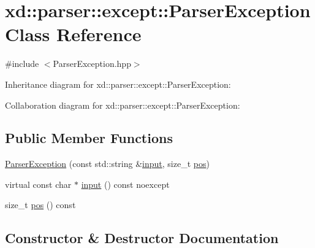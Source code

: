 \hypertarget{classxd_1_1parser_1_1except_1_1_parser_exception}{}\section{xd\+:\+:parser\+:\+:except\+:\+:Parser\+Exception Class Reference}
\label{classxd_1_1parser_1_1except_1_1_parser_exception}


{\ttfamily \#include $<$Parser\+Exception.\+hpp$>$}



Inheritance diagram for xd\+:\+:parser\+:\+:except\+:\+:Parser\+Exception\+:


Collaboration diagram for xd\+:\+:parser\+:\+:except\+:\+:Parser\+Exception\+:
\subsection*{Public Member Functions}
\begin{DoxyCompactItemize}
\item 
\mbox{\hyperlink{classxd_1_1parser_1_1except_1_1_parser_exception_a853b1789e635264affed1e4b7370fbe7}{Parser\+Exception}} (const std\+::string \&\mbox{\hyperlink{classxd_1_1parser_1_1except_1_1_parser_exception_a6fde0ecef06df6bc2bcaef504269acea}{input}}, size\+\_\+t \mbox{\hyperlink{classxd_1_1parser_1_1except_1_1_parser_exception_ab58b07ce51aef576df0cfe45f0c7e222}{pos}})
\item 
virtual const char $\ast$ \mbox{\hyperlink{classxd_1_1parser_1_1except_1_1_parser_exception_a6fde0ecef06df6bc2bcaef504269acea}{input}} () const noexcept
\item 
size\+\_\+t \mbox{\hyperlink{classxd_1_1parser_1_1except_1_1_parser_exception_ab58b07ce51aef576df0cfe45f0c7e222}{pos}} () const
\end{DoxyCompactItemize}


\subsection{Constructor \& Destructor Documentation}
\mbox{\label{classxd_1_1parser_1_1except_1_1_parser_exception_a853b1789e635264affed1e4b7370fbe7}} 
